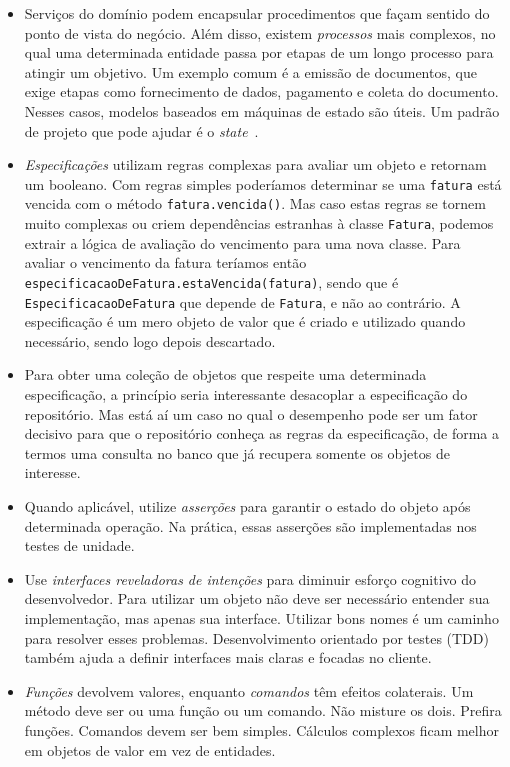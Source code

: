 \documentclass[a4paper, 12pt]{article}
\newcommand{\code}[1]{\texttt{#1}}
\begin{document}
\begin{itemize}
\item Serviços do domínio podem encapsular procedimentos que façam sentido do ponto de vista do negócio. Além disso, existem \emph{processos} mais complexos, no qual uma determinada entidade passa por etapas de um longo processo para atingir um objetivo. Um exemplo comum é a emissão de documentos, que exige etapas como fornecimento de dados, pagamento e coleta do documento. Nesses casos, modelos baseados em máquinas de estado são úteis. Um padrão de projeto que pode ajudar é o \emph{state}~\cite{Freeman2004Patterns}.

\item \emph{Especificações} utilizam regras complexas para avaliar um objeto e retornam um booleano. Com regras simples poderíamos determinar se uma \code{fatura} está vencida com o método \code{fatura.vencida()}. Mas caso estas regras se tornem muito complexas ou criem dependências estranhas à classe \code{Fatura}, podemos extrair a lógica de avaliação do vencimento para uma nova classe. Para avaliar o vencimento da fatura teríamos então \code{especificacaoDeFatura.estaVencida(fatura)}, sendo que é \code{EspecificacaoDeFatura} que depende de \code{Fatura}, e não ao contrário. A especificação é um mero objeto de valor que é criado e utilizado quando necessário, sendo logo depois descartado.

\item Para obter uma coleção de objetos que respeite uma determinada especificação, a princípio seria interessante desacoplar a especificação do repositório. Mas está aí um caso no qual o desempenho pode ser um fator decisivo para que o repositório conheça as regras da especificação, de forma a termos uma consulta no banco que já recupera somente os objetos de interesse.

\item Quando aplicável, utilize \emph{asserções} para garantir o estado do objeto após determinada operação. Na prática, essas asserções são implementadas nos testes de unidade.

\item Use \emph{interfaces reveladoras de intenções} para diminuir esforço cognitivo do desenvolvedor. Para utilizar um objeto não deve ser necessário entender sua implementação, mas apenas sua interface. Utilizar bons nomes é um caminho para resolver esses problemas. Desenvolvimento orientado por testes (TDD) também ajuda a definir interfaces mais claras e focadas no cliente.

\item \emph{Funções} devolvem valores, enquanto \emph{comandos} têm efeitos colaterais. Um método deve ser ou uma função ou um comando. Não misture os dois. Prefira funções. Comandos devem ser bem simples. Cálculos complexos ficam melhor em objetos de valor em vez de entidades.


\end{itemize}
\end{document}
